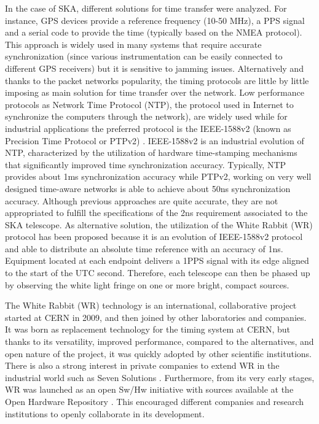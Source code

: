 In the case of SKA, different solutions for time transfer were analyzed. For instance, GPS devices provide a reference frequency (10-50 MHz), a PPS signal and a serial code to provide the time (typically based on the NMEA protocol). This approach is widely used in many systems that require accurate synchronization (since various instrumentation can be easily connected to different GPS receivers) but it is sensitive to jamming issues. Alternatively and thanks to the packet networks popularity, the timing protocols are little by little imposing as main solution for time transfer over the network. Low performance protocols as Network Time Protocol (NTP), the protocol used in Internet to synchronize the computers through the network), \cite{ntf:ntp_std} are widely used while for industrial applications the preferred protocol is the IEEE-1588v2 (known as Precision Time Protocol or PTPv2) \cite{ieee:ieee1588_std} \cite{itu:TG8275_1_Y_1369_1}. IEEE-1588v2 is an industrial evolution of NTP, characterized by the utilization of hardware time-stamping mechanisms that significantly improved time synchronization accuracy. Typically, NTP provides about 1ms synchronization accuracy while PTPv2, working on very well designed time-aware networks is able to achieve about 50ns synchronization accuracy. 
Although previous approaches are quite accurate, they are not appropriated to fulfill the specifications of the 2ns requirement associated to the SKA telescope. As alternative solution, the utilization of the White Rabbit (WR) protocol has been proposed because it is an evolution of IEEE-1588v2 protocol and able to distribute an absolute time reference with an accuracy of 1ns. Equipment located at each endpoint delivers a 1PPS signal with its edge aligned to the start of the UTC second. Therefore, each telescope can then be phased up by observing the white light fringe on one or more bright, compact sources.

The White Rabbit (WR) technology is an international, collaborative project started at CERN in 2009, and then joined by other laboratories and companies. It was born as replacement technology for the timing system at CERN, but thanks to its versatility, improved performance, compared to the alternatives, and open nature of the project, it was quickly adopted by other scientific institutions. There is also a strong interest in private companies to extend WR in the industrial world such as Seven Solutions \cite{sevensols:wr}. Furthermore, from its very early stages, WR was launched as an open Sw/Hw initiative with sources available at the Open Hardware Repository \cite{ohwr:repo}. This encouraged different companies and research institutions to openly collaborate in its development.

